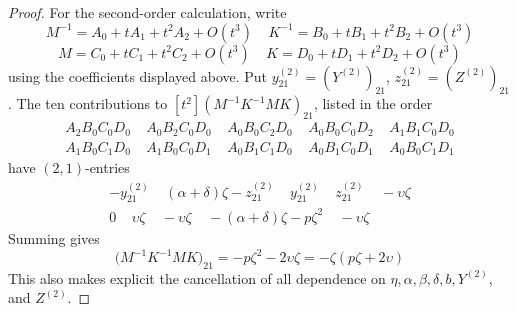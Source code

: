 \documentclass[10pt,a4paper]{amsart}
\begin{document}
\begin{proof}
For the second-order calculation, write
\begin{equation*}
	M^{-1}=A_0+tA_1+t^2A_2+O(t^3) \ \ \ \ \
	K^{-1}=B_0+tB_1+t^2B_2+O(t^3)
\end{equation*}
\begin{equation*}
	M=C_0+tC_1+t^2C_2+O(t^3) \ \ \ \ \
	K=D_0+tD_1+t^2D_2+O(t^3)
\end{equation*}
using the coefficients displayed above.  Put $y_{21}^{(2)}=(Y^{(2)})_{21}$, $z_{21}^{(2)}=(Z^{(2)})_{21}$. The ten contributions to $[t^2](M^{-1}K^{-1}MK)_{21}$, listed in the order
\begin{equation*}
	\begin{gathered}
		A_2B_0C_0D_0 \ \ \ \ \
		A_0B_2C_0D_0 \ \ \ \ \
		A_0B_0C_2D_0 \ \ \ \ \ 
		A_0B_0C_0D_2 \ \ \ \ \ 
		A_1B_1C_0D_0 \\
		A_1B_0C_1D_0 \ \ \ \ \ 
		A_1B_0C_0D_1 \ \ \ \ \
		A_0B_1C_1D_0 \ \ \ \ \
		A_0B_1C_0D_1 \ \ \ \ \
		A_0B_0C_1D_1
	\end{gathered}
\end{equation*}
have $(2,1)$-entries
\begin{equation*}
	\begin{gathered}
		-y_{21}^{(2)} \ \ \ \ \
		(\alpha+\delta)\zeta-z_{21}^{(2)} \ \ \ \ \
		y_{21}^{(2)} \ \ \ \ \
		z_{21}^{(2)} \ \ \ \ \
		-\upsilon\zeta \\
		0 \ \ \ \ \
		\upsilon\zeta \ \ \ \ \
		-\upsilon\zeta \ \ \ \ \
		-(\alpha+\delta)\zeta-p\zeta^2 \ \ \ \ \
		-\upsilon\zeta
	\end{gathered}
\end{equation*}
Summing gives
\begin{equation*}
	[t^2]\bigl(M^{-1}K^{-1}MK\bigr)_{21} = -p\zeta^2-2\upsilon\zeta = -\zeta(p\zeta+2\upsilon)
\end{equation*}
This also makes explicit the cancellation of all dependence on $\eta,\alpha,\beta,\delta,b,Y^{(2)}$, and $Z^{(2)}$.
\end{proof}
\end{document}
